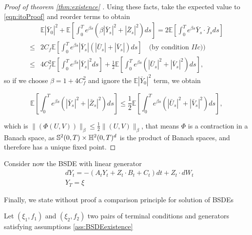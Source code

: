 \begin{proof}[Proof of theorem \ref{thm:existence} ]
Using these facts, take the expected value to \eqref{eqn:itoProof} and reorder terms to obtain 
\begin{equation}
	\begin{aligned}
		& \mathbb{E}\left|\bar{Y}_0\right|^2+\mathbb{E}\left[\int_0^T e^{\beta s}\left(\beta\left|\bar{Y}_s\right|^2+\left|\bar{Z}_s\right|^2\right) d s\right]=2 \mathbb{E}\left[\int_0^T e^{\beta s} \bar{Y}_s \cdot \bar{f}_s d s\right] \\
		\leq & 2 C_f \mathbb{E}\left[\int_0^T e^{\beta s}\left|\bar{Y}_s\right|\left(\left|\bar{U}_s\right|+\left|\bar{V}_s\right|\right) d s\right] \quad \text{(by condition $IIc$))}  \\
		\leq & 4 C_f^2 \mathbb{E}\left[\int_0^T e^{\beta s}\left|\bar{Y}_s\right|^2 d s\right]+\frac{1}{2} \mathbb{E}\left[\int_0^T e^{\beta s}\left(\left|\bar{U}_s\right|^2+\left|\bar{V}_s\right|^2\right) d s\right],
	\end{aligned}
\end{equation}
so if we choose $\beta=1+4C_f^2$ and ignore the $ \mathbb{E}\left|\bar{Y}_0\right|^2$ term, we obtain

\begin{equation}
	 \mathbb{E}\left[\int_0^T e^{\beta s}\left(\left|\bar{Y}_s\right|^2+\left|\bar{Z}_s\right|^2\right) d s\right] \leq \frac{1}{2}  \mathbb{E}\left[\int_0^T e^{\beta s}\left(\left|\bar{U}_s\right|^2+\left|\bar{V}_s\right|^2\right) d s\right],
\end{equation}

which is $\lVert(\Phi(U,V))\rVert_\beta \leq \frac{1}{2}\lVert(U,V)\rVert_\beta$, that means $\Phi$ is a contraction in a Banach space, as $\mathbb{S}^2(0,T) \times \mathbb{H}^2(0,T)^d$ is the product of Banach spaces, and therefore has a unique fixed point.
\end{proof}

Consider now the BSDE with linear generator
\begin{equation}
	\begin{split}
		&dY_t=-(A_tY_t+Z_t\cdot B_t+C_t)dt+Z_t\cdot dW_t\\
		&Y_T=\xi
	\end{split}
\end{equation}

Finally, we state without proof a comparison principle for solution of BSDEs
\begin{theorem}
	Let $(\xi_1,f_1)$ and $(\xi_2,f_2)$ two pairs of terminal conditions and generators satisfying assumptions \ref{ass:BSDEexistence}
\end{theorem}
